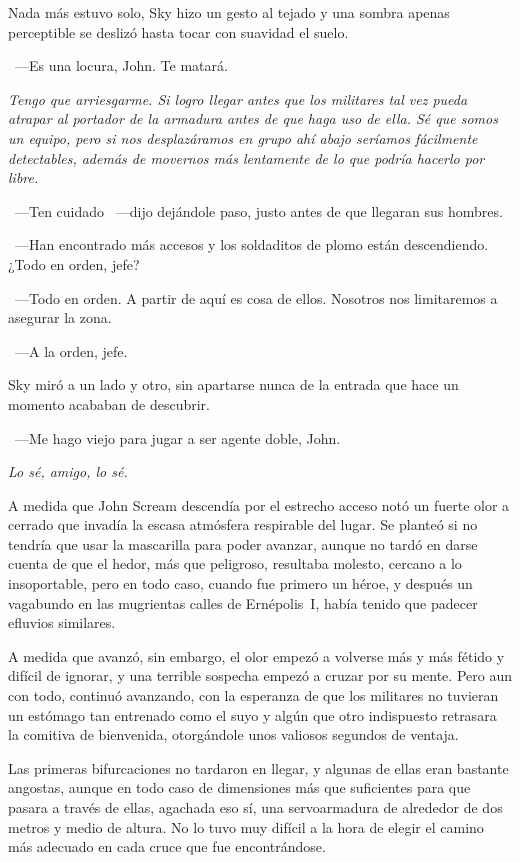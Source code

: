 Nada más estuvo solo, Sky hizo un gesto al tejado y una sombra apenas perceptible se deslizó hasta tocar con suavidad el suelo.

~---Es una locura, John. Te matará.

\emph{Tengo que arriesgarme. Si logro llegar antes que los militares tal vez pueda atrapar al portador de la armadura antes de que haga uso de ella. Sé que somos un equipo, pero si nos desplazáramos en grupo ahí abajo seríamos fácilmente detectables, además de movernos más lentamente de lo que podría hacerlo por libre.}

~---Ten cuidado ~---dijo dejándole paso, justo antes de que llegaran sus hombres.

~---Han encontrado más accesos y los soldaditos de plomo están descendiendo. ¿Todo en orden, jefe?

~---Todo en orden. A partir de aquí es cosa de ellos. Nosotros nos limitaremos a asegurar la zona.

~---A la orden, jefe.

Sky miró a un lado y otro, sin apartarse nunca de la entrada que hace un momento acababan de descubrir.

~---Me hago viejo para jugar a ser agente doble, John.

\emph{Lo sé, amigo, lo sé.}

\bigskip\noindent
A medida que John Scream descendía por el estrecho acceso notó un fuerte olor a cerrado que invadía la escasa atmósfera respirable del lugar. Se planteó si no tendría que usar la mascarilla para poder avanzar, aunque no tardó en darse cuenta de que el hedor, más que peligroso, resultaba molesto, cercano a lo insoportable, pero en todo caso, cuando fue primero un héroe, y después un vagabundo en las mugrientas calles de Ernépolis~I, había tenido que padecer efluvios similares.

A medida que avanzó, sin embargo, el olor empezó a volverse más y más fétido y difícil de ignorar, y una terrible sospecha empezó a cruzar por su mente. Pero aun con todo, continuó avanzando, con la esperanza de que los militares no tuvieran un estómago tan entrenado como el suyo y algún que otro indispuesto retrasara la comitiva de bienvenida, otorgándole unos valiosos segundos de ventaja.

Las primeras bifurcaciones no tardaron en llegar, y algunas de ellas eran bastante angostas, aunque en todo caso de dimensiones más que suficientes para que pasara a través de ellas, agachada eso sí, una servoarmadura de alrededor de dos metros y medio de altura. No lo tuvo muy difícil a la hora de elegir el camino más adecuado en cada cruce que fue encontrándose.

